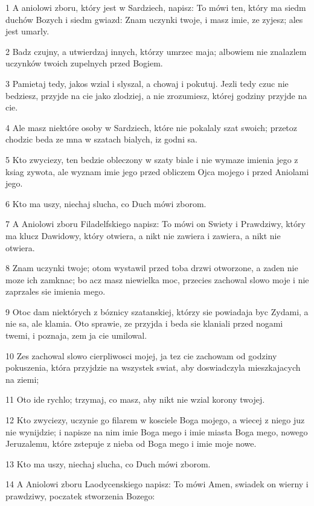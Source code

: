 \par 1 A aniolowi zboru, który jest w Sardziech, napisz: To mówi ten, który ma siedm duchów Bozych i siedm gwiazd: Znam uczynki twoje, i masz imie, ze zyjesz; ales jest umarly.
\par 2 Badz czujny, a utwierdzaj innych, którzy umrzec maja; albowiem nie znalazlem uczynków twoich zupelnych przed Bogiem.
\par 3 Pamietaj tedy, jakos wzial i slyszal, a chowaj i pokutuj. Jezli tedy czuc nie bedziesz, przyjde na cie jako zlodziej, a nie zrozumiesz, której godziny przyjde na cie.
\par 4 Ale masz niektóre osoby w Sardziech, które nie pokalaly szat swoich; przetoz chodzic beda ze mna w szatach bialych, iz godni sa.
\par 5 Kto zwyciezy, ten bedzie obleczony w szaty biale i nie wymaze imienia jego z ksiag zywota, ale wyznam imie jego przed obliczem Ojca mojego i przed Aniolami jego.
\par 6 Kto ma uszy, niechaj slucha, co Duch mówi zborom.
\par 7 A Aniolowi zboru Filadelfskiego napisz: To mówi on Swiety i Prawdziwy, który ma klucz Dawidowy, który otwiera, a nikt nie zawiera i zawiera, a nikt nie otwiera.
\par 8 Znam uczynki twoje; otom wystawil przed toba drzwi otworzone, a zaden nie moze ich zamknac; bo acz masz niewielka moc, przecies zachowal slowo moje i nie zaprzales sie imienia mego.
\par 9 Otoc dam niektórych z bóznicy szatanskiej, którzy sie powiadaja byc Zydami, a nie sa, ale klamia. Oto sprawie, ze przyjda i beda sie klaniali przed nogami twemi, i poznaja, zem ja cie umilowal.
\par 10 Zes zachowal slowo cierpliwosci mojej, ja tez cie zachowam od godziny pokuszenia, która przyjdzie na wszystek swiat, aby doswiadczyla mieszkajacych na ziemi;
\par 11 Oto ide rychlo; trzymaj, co masz, aby nikt nie wzial korony twojej.
\par 12 Kto zwyciezy, uczynie go filarem w kosciele Boga mojego, a wiecej z niego juz nie wynijdzie; i napisze na nim imie Boga mego i imie miasta Boga mego, nowego Jeruzalemu, które zstepuje z nieba od Boga mego i imie moje nowe.
\par 13 Kto ma uszy, niechaj slucha, co Duch mówi zborom.
\par 14 A Aniolowi zboru Laodycenskiego napisz: To mówi Amen, swiadek on wierny i prawdziwy, poczatek stworzenia Bozego:
